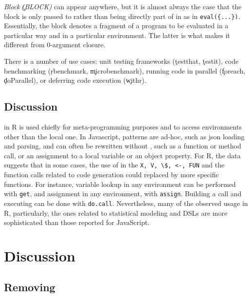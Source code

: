 \documentclass[screen,acmsmall]{acmart}%
\newcommand{\authorcomment}[3]{\xspace\textcolor{#1}{{\bf #2} #3}\xspace}
\newcommand{\todo}[1]{\authorcomment{red}{TODO}{#1}}
\newcommand{\code}[1]{\lstinline |#1|\xspace}
\begin{document}
\begin{compactitem}[---]
  \item \emph{Block \c{(BLOCK)}} can appear anywhere, but it is almost always
    the case that the block is only passed to \eval rather than being directly
    part of in as in \lstinline|eval({...})|. Essentially, the block denotes a
    fragment of a program to be evaluated in a particular way and in a particular
    environment. The latter is what makes it different from 0-argument closure.

    There is a number of use cases: unit testing frameworks (\eg \c{testthat},
    \c{testit}), code benchmarking (\eg \c{rbenchmark}, \c{microbenchmark}),
    running code in parallel (\eg \c{foreach}, \c{doParallel}), or deferring
    code execution (\eg \c{withr}).

\end{compactitem}





\subsection{Discussion}

\Eval in R is used chiefly for meta-programming purposes and to access
environments other than the local one. In Javascript, patterns are ad-hoc, such
as json loading and parsing, and can often be rewritten without \eval, such as a
function or method call, or an assignment to a local variable or an object
property. For R, the data suggests that in some cases, the use of \eval in the
\code{X, V, \$, <-, FUN} and the function calls related to code generation could
replaced by more specific functions. For instance, variable lookup in any
environment can be performed with \code{get}, and assignment in any environment,
with \code{assign}. Building a call and executing can be done with \code{do.call}.
Nevertheless, many of the observed \eval usage in R, particularly, the ones
related to statistical modeling and DSLs are more sophisticated than those
reported for JavaScript.



\section{Discussion}

\subsection{Removing \eval}
\end{document}
